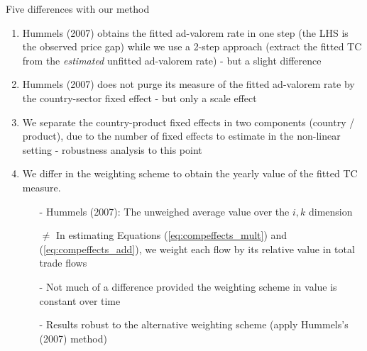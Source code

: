 \documentclass[10 pt,Helvetica, french]{beamer}
\begin{document}
\begin{frame}[label = app_compeffects_Hummels2]
Five differences with our method  \vspace{0.1cm}
\footnotesize
\begin{enumerate}

\item Hummels (2007) obtains the fitted ad-valorem rate in one step (the LHS is the observed price gap) while we use a 2-step approach (extract the fitted TC from the \textit{estimated} unfitted ad-valorem rate) - but a slight difference \vspace{0.1cm}
\item Hummels (2007) does not purge its measure of the fitted ad-valorem rate by the country-sector fixed effect  - but only a scale effect \vspace{0.1cm}
\item We separate the country-product fixed effects in two components (country / product), due to the number of fixed effects to estimate in the non-linear setting - robustness analysis to this point \vspace{0.1cm}
\item We differ in the weighting scheme to obtain the yearly value of the fitted TC measure.  \vspace{0.1cm}
\begin{itemize}
\footnotesize
\item[-] Hummels (2007): The unweighed average value over the $i,k$ dimension \vspace{0.1cm}
\item[$\neq$] In estimating Equations (\ref{eq:compeffects_mult}) and (\ref{eq:compeffects_add}), we weight each flow by its relative value in total trade flows  \vspace{0.1cm}
\item[-] Not much of a difference provided the weighting scheme in value is constant over time \vspace{0.1cm}
\item[-] Results robust to the alternative weighting scheme (apply Hummels's (2007) method)
\end{itemize}

\end{enumerate}
\normalsize

\end{frame}
\end{document}
